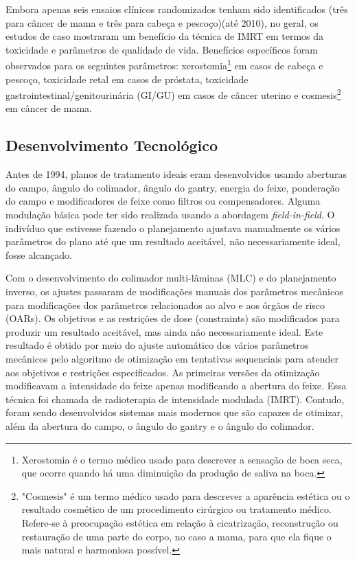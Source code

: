 \documentclass[11pt,a4paper]{article}
\begin{document}
	Embora apenas seis ensaios clínicos randomizados tenham sido identificados (três para câncer de mama e três para cabeça e pescoço)(até 2010), no geral, os estudos de caso mostraram um benefício da técnica de IMRT em termos da toxicidade e parâmetros de qualidade de vida. Benefícios específicos foram observados para os seguintes parâmetros: xerostomia\footnote{Xerostomia é o termo médico usado para descrever a sensação de boca seca, que ocorre quando há uma diminuição da produção de saliva na boca.} em casos de cabeça e pescoço, toxicidade retal em casos de próstata, toxicidade gastrointestinal/genitourinária (GI/GU) em casos de câncer uterino e cosmesis\footnote{"Cosmesis" é um termo médico usado para descrever a aparência estética ou o resultado cosmético de um procedimento cirúrgico ou tratamento médico. Refere-se à preocupação estética em relação à cicatrização, reconstrução ou restauração de uma parte do corpo, no caso a mama, para que ela fique o mais natural e harmoniosa possível.} em câncer de mama.

\subsection*{Desenvolvimento Tecnológico}

	Antes de 1994, planos de tratamento ideais eram desenvolvidos usando aberturas do campo, ângulo do colimador, ângulo do gantry, energia do feixe, ponderação do campo e modificadores de feixe como filtros ou compensadores. Alguma modulação básica pode ter sido realizada usando a abordagem \textit{field-in-field}. O indivíduo que estivesse fazendo o planejamento ajustava manualmente os vários parâmetros do plano até que um resultado aceitável, não necessariamente ideal, fosse alcançado. 

	Com o desenvolvimento do colimador multi-lâminas (MLC) e do planejamento inverso, os ajustes passaram de modificações manuais dos parâmetros mecânicos para modificações dos parâmetros relacionados ao alvo e aos órgãos de risco (OARs). Os objetivos e as restrições de dose (constraints) são modificados para produzir um resultado aceitável, mas ainda não necessariamente ideal. Este resultado é obtido por meio do ajuste automático dos vários parâmetros mecânicos pelo algoritmo de otimização em tentativas sequenciais para atender aos objetivos e restrições especificados. As primeiras versões da otimização modificavam a intensidade do feixe apenas modificando a abertura do feixe. Essa técnica foi chamada de radioterapia de intensidade modulada (IMRT). Contudo, foram sendo desenvolvidos sistemas mais modernos que são capazes de otimizar, além da abertura do campo, o ângulo do gantry e o ângulo do colimador.
\end{document}
